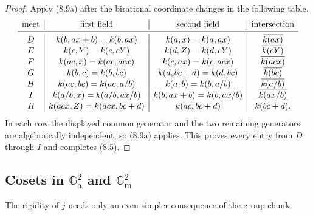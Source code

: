 \documentclass[11pt,oneside]{article}
\theoremstyle{definition}
\theoremstyle{remark}
\newcommand{\Ga}{\mathbb G_{\mathrm a}}
\newcommand{\Gm}{\mathbb G_{\mathrm m}}
\begin{document}
\begin{proof}
Apply (8.9a) after the birational coordinate changes in the following table.
\[
\begin{array}{c|c|c|c}
\text{meet}&\text{first field}&\text{second field}&\text{intersection}\\ \midrule
D&k(b,ax+b)=k(b,ax)&k(a,x)=k(a,ax)&\overline{k(ax)}\\
E&k(c,Y)=k(c,cY)&k(d,Z)=k(d,cY)&\overline{k(cY)}\\
F&k(ac,x)=k(ac,acx)&k(c,ax)=k(c,acx)&\overline{k(acx)}\\
G&k(b,c)=k(b,bc)&k(d,bc+d)=k(d,bc)&\overline{k(bc)}\\
H&k(ac,bc)=k(ac,a/b)&k(a,b)=k(b,a/b)&\overline{k(a/b)}\\
I&k(a/b,x)=k(a/b,ax/b)&k(b,ax+b)=k(b,ax/b)&\overline{k(ax/b)}\\
R&k(acx,Z)=k(acx,bc+d)&k(ac,bc+d)&\overline{k(bc+d)}.
\end{array}
\]
In each row the displayed common generator and the two remaining generators are
algebraically independent, so (8.9a) applies.  This proves every entry from $D$ through
$I$ and completes (8.5).
\end{proof}

\subsection[Cosets in the additive and multiplicative squares]
{Cosets in $\Ga^2$ and $\Gm^2$}

The rigidity of $j$ needs only an even simpler consequence of the group chunk.
\end{document}
